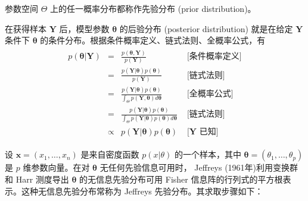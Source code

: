 \documentclass[12pt,a4paper,UTF8,twoside]{book}
\theoremstyle{definition}
\theoremstyle{definition}
\theoremstyle{definition}
\theoremstyle{remark}
\let\BeginKnitrBlock\begin \let\EndKnitrBlock\end
\begin{document}
\BeginKnitrBlock{definition}[先验分布]
\protect\hypertarget{def:prior-distribution}{}{\label{def:prior-distribution}
{} }参数空间 \(\Theta\)
上的任一概率分布都称作先验分布 (prior distribution)。
\EndKnitrBlock{definition}

\BeginKnitrBlock{definition}[后验分布]
\protect\hypertarget{def:posterior-distribution}{}{\label{def:posterior-distribution}
{} }在获得样本 \(\mathbf{Y}\) 后，模型参数
\(\boldsymbol{\theta}\) 的后验分布 (posterior distribution) 就是在给定
\(\mathbf{Y}\) 条件下 \(\boldsymbol{\theta}\)
的条件分布。根据条件概率定义、链式法则、全概率公式，有 \begin{align}
\begin{array}{rcll}
p(\boldsymbol{\theta}|\mathbf{Y})  & =  & \displaystyle \frac{p(\boldsymbol{\theta},\mathbf{Y})}{p(\mathbf{Y})}
& \mbox{ [条件概率定义]}
\\[16pt]
& = & \displaystyle \frac{p(\mathbf{Y}|\boldsymbol{\theta}) p(\boldsymbol{\theta})}{p(\mathbf{Y})}
& \mbox{ [链式法则]}
\\[16pt]
& = & \displaystyle \frac{p(\mathbf{Y}|\boldsymbol{\theta})p(\boldsymbol{\theta})}{\int_{\Theta}p(\mathbf{Y},\boldsymbol{\theta})d\boldsymbol{\theta}}
& \mbox{ [全概率公式]}
\\[16pt]
& = & \displaystyle \frac{p(\mathbf{Y}|\boldsymbol{\theta})p(\boldsymbol{\theta})}{\int_{\Theta}p(\mathbf{Y}|\boldsymbol{\theta})p(\boldsymbol{\theta})d\boldsymbol{\theta}}
& \mbox{ [链式法则]}
\\[16pt]
& \propto & \displaystyle p(\mathbf{Y}|\boldsymbol{\theta})p(\boldsymbol{\theta})
& \mbox{ [$\mathbf{Y}$ 已知]}
\end{array} \label{eq:bayes-theorem}
\end{align}
\EndKnitrBlock{definition}

\BeginKnitrBlock{definition}[Jeffreys 先验分布]
\protect\hypertarget{def:Jeffreys-prior-distribution}{}{\label{def:Jeffreys-prior-distribution}
{} }设 \(\mathbf{x} = (x_1,\ldots,x_n)\)
是来自密度函数 \(p(x|\theta)\) 的一个样本，其中
\(\boldsymbol{\theta} = (\theta_1,\ldots,\theta_p)\) 是 \(p\)
维参数向量。在对 \(\boldsymbol{\theta}\) 无任何先验信息可用时， Jeffreys
(1961年)利用变换群和 Harr 测度导出 \(\boldsymbol{\theta}\)
的无信息先验分布可用 Fisher
信息阵的行列式的平方根表示。这种无信息先验分布常称为 Jeffreys
先验分布。其求取步骤如下：
\EndKnitrBlock{definition}
\end{document}
